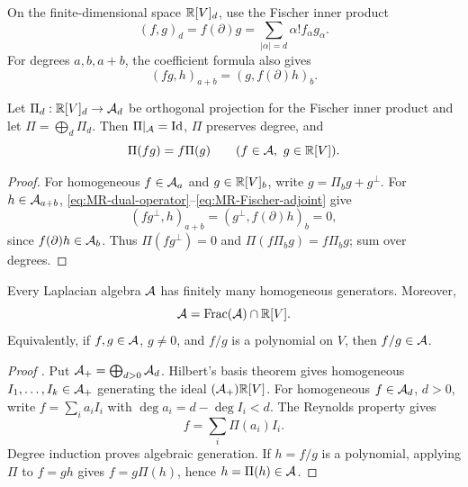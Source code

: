 On the finite-dimensional space \(\mathbb R[V]_d\), use the Fischer inner
product
\[
 (f,g)_d=f(\partial)g
 =\sum_{|\alpha|=d}\alpha! f_\alpha g_\alpha.
\]
For degrees \(a,b,a+b\), the coefficient formula also gives
\begin{equation}\label{eq:MR-Fischer-adjoint}
 (fg,h)_{a+b}=(g,f(\partial)h)_b.
\end{equation}

\begin{proposition}
\label{prop:MR-Reynolds}
Let \(\Pi_d:\mathbb R[V]_d\to\mathcal A_d\) be orthogonal projection for the
Fischer inner product and let \(\Pi=\bigoplus_d\Pi_d\). Then
\(\Pi|_{\mathcal A}=\operatorname{Id}\), \(\Pi\) preserves degree, and
\begin{equation}\label{eq:MR-Reynolds-property}
 \Pi(fg)=f\Pi(g)\qquad(f\in\mathcal A,\ g\in\mathbb R[V]).
\end{equation}
\end{proposition}

\begin{proof}
For homogeneous \(f\in\mathcal A_a\) and \(g\in\mathbb R[V]_b\), write
\(g=\Pi_b g+g^\perp\).
For \(h\in\mathcal A_{a+b}\),
\eqref{eq:MR-dual-operator}--\eqref{eq:MR-Fischer-adjoint} give
\[
 (fg^\perp,h)_{a+b}=(g^\perp,f(\partial)h)_b=0,
\]
since \(f(\partial)h\in\mathcal A_b\). Thus \(\Pi(fg^\perp)=0\) and
\(\Pi(f\Pi_b g)=f\Pi_b g\); sum over degrees.
\end{proof}

\begin{proposition}
\label{prop:MR-finite-and-division}
Every Laplacian algebra \(\mathcal A\) has finitely many homogeneous
generators. Moreover,
\begin{equation}\label{eq:MR-polynomial-quotients}
 \mathcal A=\operatorname{Frac}(\mathcal A)\cap\mathbb R[V].
\end{equation}
Equivalently, if \(f,g\in\mathcal A\), \(g\neq0\), and \(f/g\) is a
polynomial on \(V\), then \(f/g\in\mathcal A\).
\end{proposition}

\begin{proof}[Proof {\normalfont\cite[Lemma~24(a)--(b)]{MendesRadeschi}}]
Put \(\mathcal A_+=\bigoplus_{d>0}\mathcal A_d\).
Hilbert's basis theorem
\cite[Chapter~I, Section~2, Proposition~2.3 and Corollary~2.4, p.~11]{Kunz2013}
gives homogeneous \(I_1,\ldots,I_k\in\mathcal A_+\) generating the ideal
\((\mathcal A_+)\mathbb R[V]\). For homogeneous \(f\in\mathcal A_d\), \(d>0\), write
\(f=\sum_i a_iI_i\) with \(\deg a_i=d-\deg I_i<d\).
The Reynolds property gives
\[
 f=\sum_i\Pi(a_i)I_i.
\]
Degree induction proves algebraic generation. If \(h=f/g\) is a
polynomial, applying \(\Pi\) to \(f=gh\) gives
\(f=g\Pi(h)\), hence \(h=\Pi(h)\in\mathcal A\).
\end{proof}

